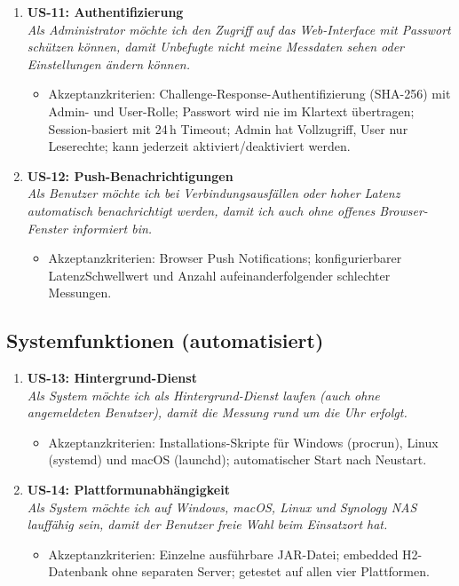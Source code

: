 \begin{enumerate}[resume]
  \item \textbf{US-11: Authentifizierung}\\
    \textit{Als Administrator möchte ich den Zugriff auf das Web-Interface mit Passwort
    schützen können, damit Unbefugte nicht meine Messdaten sehen oder Einstellungen
    ändern können.}
    \begin{itemize}
      \item Akzeptanzkriterien: Challenge-Response-Authentifizierung (SHA-256) mit
        Admin- und User-Rolle; Passwort wird nie im Klartext übertragen;
        Session-basiert mit 24\,h Timeout; Admin hat Vollzugriff, User nur
        Leserechte; kann jederzeit aktiviert/deaktiviert werden.
    \end{itemize}

  \item \textbf{US-12: Push-Benachrichtigungen}\\
    \textit{Als Benutzer möchte ich bei Verbindungsausfällen oder hoher Latenz automatisch
    benachrichtigt werden, damit ich auch ohne offenes Browser-Fenster informiert bin.}
    \begin{itemize}
      \item Akzeptanzkriterien: Browser Push Notifications; konfigurierbarer
        Latenz\-Schwell\-wert und Anzahl aufeinanderfolgender schlechter Messungen.
    \end{itemize}
\end{enumerate}

\subsection{Systemfunktionen (automatisiert)}

\begin{enumerate}[resume]
  \item \textbf{US-13: Hintergrund-Dienst}\\
    \textit{Als System möchte ich als Hintergrund-Dienst laufen (auch ohne angemeldeten
    Benutzer), damit die Messung rund um die Uhr erfolgt.}
    \begin{itemize}
      \item Akzeptanzkriterien: Installations-Skripte für Windows (procrun),
        Linux (systemd) und macOS (launchd); automatischer Start nach Neustart.
    \end{itemize}

  \item \textbf{US-14: Plattformunabhängigkeit}\\
    \textit{Als System möchte ich auf Windows, macOS, Linux und Synology NAS lauffähig sein,
    damit der Benutzer freie Wahl beim Einsatzort hat.}
    \begin{itemize}
      \item Akzeptanzkriterien: Einzelne ausführbare JAR-Datei; embedded H2-Datenbank
        ohne separaten Server; getestet auf allen vier Plattformen.
    \end{itemize}
\end{enumerate}
